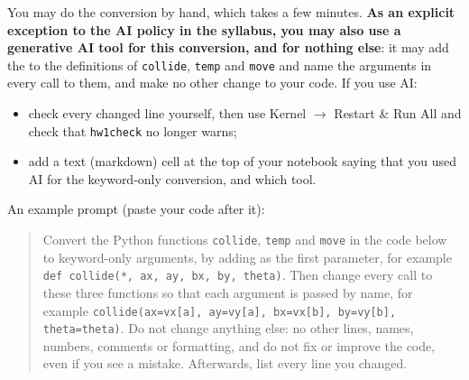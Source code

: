 \documentclass[12pt]{article}
\begin{document}
You may do the conversion by hand, which takes a few minutes.  {\bf As an explicit exception to the
AI policy in the syllabus, you may also use a generative AI tool for this conversion, and for nothing
else}:  it may add the {\tt *} to the definitions of {\tt collide}, {\tt temp} and {\tt move} and
name the arguments in every call to them, and make no other change to your code.  If you use AI:
\begin{itemize}
\item check every changed line yourself, then use Kernel $\rightarrow$ Restart \& Run All and check
  that {\tt hw1check} no longer warns;
\item add a text (markdown) cell at the top of your notebook saying that you used AI for the
  keyword-only conversion, and which tool.
\end{itemize}
An example prompt (paste your code after it):
\begin{quote}\small
Convert the Python functions {\tt collide}, {\tt temp} and {\tt move} in the code below to
keyword-only arguments, by adding {\tt *} as the first parameter, for example {\tt def collide(*,
ax, ay, bx, by, theta)}.  Then change every call to these three functions so that each argument is
passed by name, for example {\tt collide(ax=vx[a], ay=vy[a], bx=vx[b], by=vy[b], theta=theta)}.
Do not change anything else:  no other lines, names, numbers, comments or formatting, and do not fix
or improve the code, even if you see a mistake.  Afterwards, list every line you changed.
\end{quote}
\end{document}
